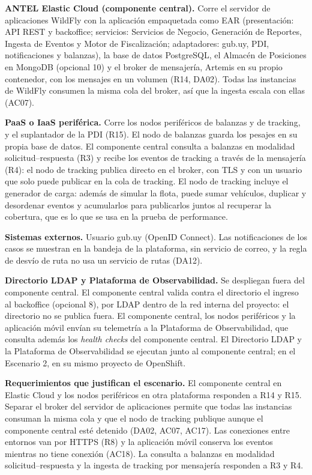 \textbf{ANTEL Elastic Cloud (componente central).} Corre el servidor de aplicaciones WildFly con la aplicación empaquetada como EAR (presentación: API REST y backoffice; servicios: Servicios de Negocio, Generación de Reportes, Ingesta de Eventos y Motor de Fiscalización; adaptadores: gub.uy, PDI, notificaciones y balanzas), la base de datos PostgreSQL, el Almacén de Posiciones en MongoDB (opcional 10) y el broker de mensajería, Artemis en su propio contenedor, con los mensajes en un volumen (R14, DA02). Todas las instancias de WildFly consumen la misma cola del broker, así que la ingesta escala con ellas (AC07).

\textbf{PaaS o IaaS periférica.} Corre los nodos periféricos de balanzas y de tracking, y el suplantador de la PDI (R15). El nodo de balanzas guarda los pesajes en su propia base de datos. El componente central consulta a balanzas en modalidad solicitud--respuesta (R3) y recibe los eventos de tracking a través de la mensajería (R4): el nodo de tracking publica directo en el broker, con TLS y con un usuario que solo puede publicar en la cola de tracking. El nodo de tracking incluye el generador de carga: además de simular la flota, puede sumar vehículos, duplicar y desordenar eventos y acumularlos para publicarlos juntos al recuperar la cobertura, que es lo que se usa en la prueba de performance.

\textbf{Sistemas externos.} Usuario gub.uy (OpenID Connect). Las notificaciones de los casos se muestran en la bandeja de la plataforma, sin servicio de correo, y la regla de desvío de ruta no usa un servicio de rutas (DA12).

\textbf{Directorio LDAP y Plataforma de Observabilidad.} Se despliegan fuera del componente central. El componente central valida contra el directorio el ingreso al backoffice (opcional 8), por LDAP dentro de la red interna del proyecto: el directorio no se publica fuera. El componente central, los nodos periféricos y la aplicación móvil envían su telemetría a la Plataforma de Observabilidad, que consulta además los \emph{health checks} del componente central. El Directorio LDAP y la Plataforma de Observabilidad se ejecutan junto al componente central; en el Escenario 2, en su mismo proyecto de OpenShift.

\textbf{Requerimientos que justifican el escenario.} El componente central en Elastic Cloud y los nodos periféricos en otra plataforma responden a R14 y R15. Separar el broker del servidor de aplicaciones permite que todas las instancias consuman la misma cola y que el nodo de tracking publique aunque el componente central esté detenido (DA02, AC07, AC17). Las conexiones entre entornos van por HTTPS (R8) y la aplicación móvil conserva los eventos mientras no tiene conexión (AC18). La consulta a balanzas en modalidad solicitud--respuesta y la ingesta de tracking por mensajería responden a R3 y R4.

